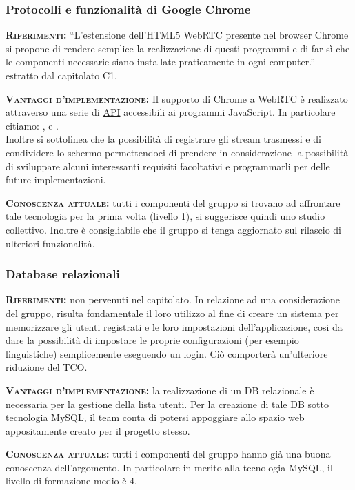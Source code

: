\subsubsection{Protocolli e funzionalità di Google Chrome}
\begin{description}
	\item{\scshape\bfseries Riferimenti:}
  ``L'estensione dell'HTML5 WebRTC presente nel browser Chrome si propone di rendere semplice la realizzazione di questi programmi e di far sì che le componenti necessarie siano installate praticamente in ogni computer.'' - estratto dal capitolato C1.
  
 	\item{\scshape\bfseries Vantaggi d'implementazione:} Il supporto di Chrome a WebRTC è realizzato attraverso una serie di \underline{API} accessibili ai programmi JavaScript. In particolare citiamo: ,  e .\\Inoltre si sottolinea che la possibilità di registrare gli stream trasmessi e di condividere lo schermo permettendoci di prendere in considerazione la possibilità di sviluppare alcuni interessanti requisiti facoltativi e programmarli per delle future implementazioni.
	
	\item{\scshape\bfseries Conoscenza attuale:} tutti i componenti del gruppo si trovano ad affrontare tale tecnologia per la prima volta (livello 1), si suggerisce quindi uno studio collettivo. Inoltre è consigliabile che il gruppo si tenga aggiornato sul rilascio di ulteriori funzionalità.
\end{description}

\subsubsection{Database relazionali}
\begin{description}
	\item{\scshape\bfseries Riferimenti:} non pervenuti nel capitolato. In relazione ad una considerazione del gruppo, risulta fondamentale il loro utilizzo al fine di creare un sistema per memorizzare gli utenti registrati e le loro impostazioni dell'applicazione, cosi da dare la possibilità di impostare le proprie configurazioni (per esempio linguistiche) semplicemente eseguendo un login. Ciò comporterà un'ulteriore riduzione del TCO.
  
 	\item{\scshape\bfseries Vantaggi d'implementazione:} la realizzazione di un DB relazionale è necessaria per la gestione della lista utenti. Per la creazione di tale DB sotto tecnologia \underline{MySQL}, il team conta di potersi appoggiare allo spazio web appositamente creato per il progetto stesso.
	
	\item{\scshape\bfseries Conoscenza attuale:} tutti i componenti del gruppo hanno già una buona conoscenza dell'argomento. In particolare in merito alla tecnologia MySQL, il livello di formazione medio è 4.
\end{description}

